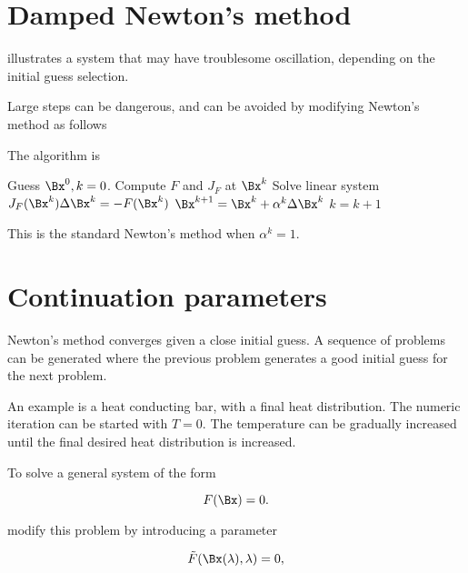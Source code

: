 \section{Damped Newton's method}

 illustrates a system that may have troublesome oscillation, depending on the initial guess selection.



Large steps can be dangerous, and can be avoided by modifying Newton's method as follows

The algorithm is
\begin{algorithmic}
\STATE Guess \( \Bx^0, k = 0 \).
\REPEAT
\STATE Compute \( F \) and \( J_F \) at \( \Bx^k \)
\STATE Solve linear system  \( J_F(\Bx^k) \Delta \Bx^k = - F(\Bx^k) \)
\STATE \( \Bx^{k+1} = \Bx^k + \alpha^k \Delta \Bx^k \)
\STATE \( k = k + 1 \)
\end{algorithmic}

This is the standard Newton's method when \( \alpha^k = 1 \).

\section{Continuation parameters}

Newton's method converges given a close initial guess.  A sequence of problems can be generated where the previous problem generates a good initial guess for the next problem.

An example is a heat conducting bar, with a final heat distribution.  The numeric iteration can be started with \( T = 0 \).  The temperature can be gradually increased until the final desired heat distribution is increased.

To solve a general system of the form

\begin{equation}\label{eqn:multiphysicsL12:340}
F(\Bx) = 0.
\end{equation}

modify this problem by introducing a parameter

\begin{equation}\label{eqn:multiphysicsL12:360}
\tilde{F}(\Bx(\lambda), \lambda) = 0,
\end{equation}

